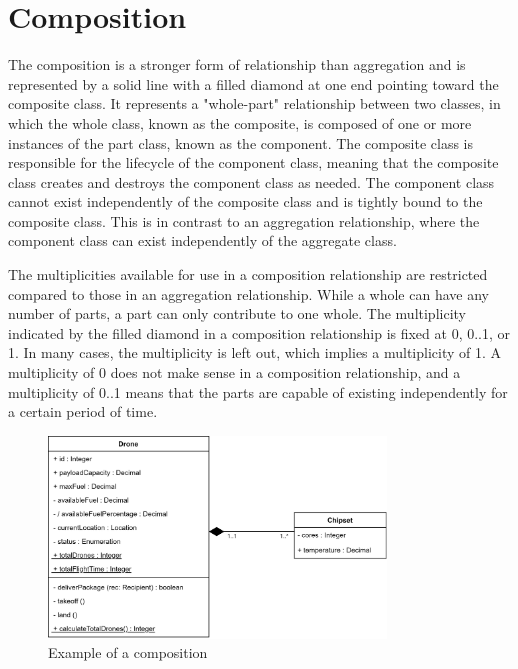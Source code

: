 \documentclass[
	12pt,
    a4paper,
    egregdoesnotlikesansseriftitles, %
    toc=chapterentrywithdots,
    oneside, openany,
    titlepage,
    parskip=half,
    headings=normal,  %
    listof=totoc,
    bibliography=totocnumbered,
    index=totoc,
    captions=tableheading,  %
    listof=flat,
    numbers=noenddot, %
    final]
    {scrbook}
\begin{document}
\section{Composition}

The composition is a stronger form of relationship than aggregation and is represented by a solid line with a filled diamond at one end pointing toward the composite class. It represents a "whole-part" relationship between two classes, in which the whole class, known as the composite, is composed of one or more instances of the part class, known as the component. \cite[p. 153-154]{uml}
The composite class is responsible for the lifecycle of the component class, meaning that the composite class creates and destroys the component class as needed. The component class cannot exist independently of the composite class and is tightly bound to the composite class. \cite{uml-diagrams-comp} This is in contrast to an aggregation relationship, where the component class can exist independently of the aggregate class.

The multiplicities available for use in a composition relationship are restricted compared to those in an aggregation relationship. While a whole can have any number of parts, a part can only contribute to one whole. The multiplicity indicated by the filled diamond in a composition relationship is fixed at 0, 0..1, or 1. In many cases, the multiplicity is left out, which implies a multiplicity of 1. A multiplicity of 0 does not make sense in a composition relationship, and a multiplicity of 0..1 means that the parts are capable of existing independently for a certain period of time.
\cite[p. 153-154]{uml} \cite[p. 68-69]{seidl2015uml}

\begin{figure}[h]
\centering
\includegraphics[width=0.8\textwidth]{figures/aggr_comp/comp.jpg}
\caption[Example composition]{Example of a composition}
\label{fig:composition_example}
\end{figure}
\end{document}
